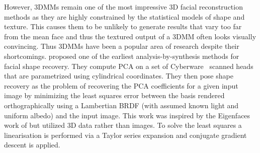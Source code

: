 However, 3DMMs remain one of the most impressive 3D facial reconstruction
methods as they are highly constrained by the statistical models
of shape and texture. This causes them to be unlikely to generate results
that vary too far from the mean face and thus the textured output of a 3DMM
often looks visually convincing. Thus 3DMMs have been a popular area of
research despite their shortcomings.
\cite{atick1996statistical} proposed one of the earliest analysis-by-synthesis
methods for facial shape recovery. They compute PCA on a set of 
Cyberware~\cite{cyberware} scanned heads that are parametrized using
cylindrical coordinates. They then pose shape recovery as the problem
of recovering the PCA coefficients for a given input image by minimizing
the least squares error between the basis rendered orthographically
using a Lambertian BRDF (with assumed known light and uniform albedo) 
and the input image. This work was inspired by the Eigenfaces work of 
\citet{Sirovich:1987te} but utilized 3D data rather than images. To solve
the least squares a linearisation is performed via a Taylor series expansion
and conjugate gradient descent is applied.
